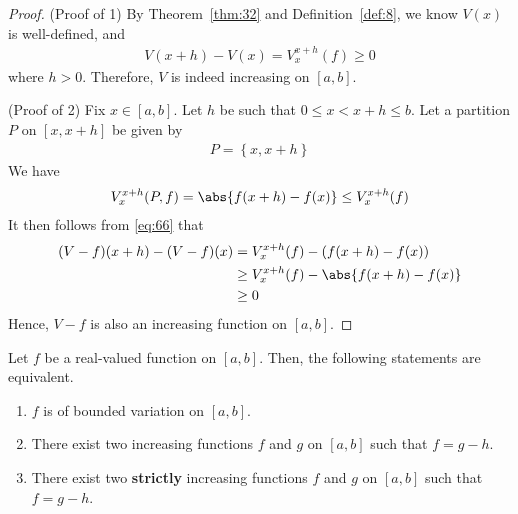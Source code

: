 \documentclass[thmcnt=section, 12pt]{elegantbook}
\begin{document}
\begin{proof}
    (Proof of 1) By Theorem~\ref{thm:32} and Definition~\ref{def:8}, we know $V(x)$ is well-defined, and 
    \begin{align*}
        V(x+h) - V(x) = V_x^{x+h}(f) \geq 0
    \end{align*}
    where $h > 0$. Therefore, $V$ is indeed increasing on $[a, b]$.

    \par (Proof of 2) Fix $x \in [a, b]$. Let $h$ be such that $0 \leq x < x+h \leq b$. Let a partition $P$ on $[x, x+h]$ be given by 
    \begin{align*}
        P = \left\{x, x+h\right\}
    \end{align*}
    We have 
    \begin{align}
        V_x^{x+h}(P, f) = \abs{f(x+h) - f(x)} 
        \leq V_x^{x+h}(f)
        \label{eq:66}
    \end{align}
    It then follows from \eqref{eq:66} that 
    \begin{align*}
        (V-f)(x+h) - (V-f)(x)
        &= V_x^{x+h}(f) - (f(x+h) - f(x)) \\ 
        &\geq V_x^{x+h}(f) - \abs{f(x+h) - f(x)} \\ 
        &\geq 0
    \end{align*}
    Hence, $V-f$ is also an increasing function on $[a, b]$.
\end{proof}


\begin{theorem} \label{thm:33}
    Let $f$ be a real-valued function on $[a, b]$. Then, the following statements are equivalent.
    \begin{enumerate}
        \item $f$ is of bounded variation on $[a, b]$.
        \item There exist two increasing functions $f$ and $g$ on $[a, b]$ such that $f = g - h$.
        \item There exist two \textbf{strictly} increasing functions $f$ and $g$ on $[a, b]$ such that $f = g - h$.
    \end{enumerate}
\end{theorem}
\end{document}
